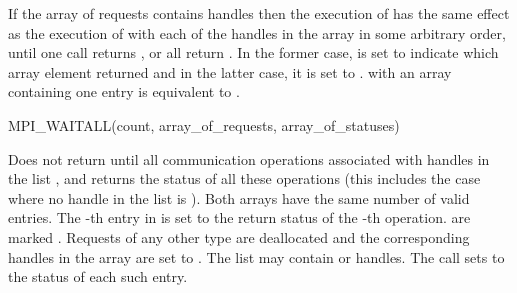 If the array of requests contains  handles then
the execution of
has the same effect as the execution of
with each of the  handles in the array
in some arbitrary order, until one call returns , or
all return .  In the former case,  is set
to indicate which array element returned 
and in the latter case, it is set to .
 with an array containing one  entry
is equivalent to .

\begin{funcdef}{MPI\_WAITALL}{(\mbox{count}, \mbox{array\_of\_requests}, \mbox{array\_of\_statuses})}
\end{funcdef}


Does not return until 
all communication operations associated with  handles
in the list , and returns the status of all these operations
(this includes the case where no handle in the list is ).
Both arrays have the same number of valid entries.  The -th entry in
 is set to the return status of the
-th operation.
  are marked .  Requests of any other type
are
deallocated and the corresponding handles in the array are set to
.
The list may contain  or  handles.
The call sets to  the status of each such entry.

